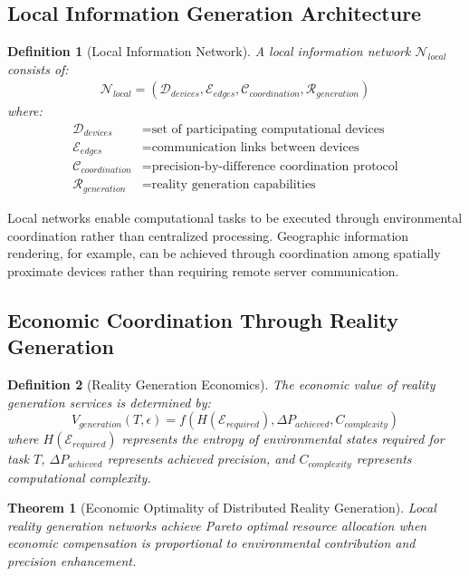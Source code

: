 \documentclass[12pt]{article}
\newtheorem{definition}{Definition}
\newtheorem{theorem}{Theorem}
\begin{document}
\subsection{Local Information Generation Architecture}

\begin{definition}[Local Information Network]
A local information network $\mathcal{N}_{local}$ consists of:
\begin{align}
\mathcal{N}_{local} = (\mathcal{D}_{devices}, \mathcal{E}_{edges}, \mathcal{C}_{coordination}, \mathcal{R}_{generation})
\end{align}
where:
\begin{align}
\mathcal{D}_{devices} &= \text{set of participating computational devices} \\
\mathcal{E}_{edges} &= \text{communication links between devices} \\
\mathcal{C}_{coordination} &= \text{precision-by-difference coordination protocol} \\
\mathcal{R}_{generation} &= \text{reality generation capabilities}
\end{align}
\end{definition}

Local networks enable computational tasks to be executed through environmental coordination rather than centralized processing. Geographic information rendering, for example, can be achieved through coordination among spatially proximate devices rather than requiring remote server communication.

\subsection{Economic Coordination Through Reality Generation}

\begin{definition}[Reality Generation Economics]
The economic value of reality generation services is determined by:
\begin{equation}
V_{generation}(T, \epsilon) = f(H(\mathcal{E}_{required}), \Delta P_{achieved}, C_{complexity})
\end{equation}
where $H(\mathcal{E}_{required})$ represents the entropy of environmental states required for task $T$, $\Delta P_{achieved}$ represents achieved precision, and $C_{complexity}$ represents computational complexity.
\end{definition}

\begin{theorem}[Economic Optimality of Distributed Reality Generation]
Local reality generation networks achieve Pareto optimal resource allocation when economic compensation is proportional to environmental contribution and precision enhancement.
\end{theorem}
\end{document}
